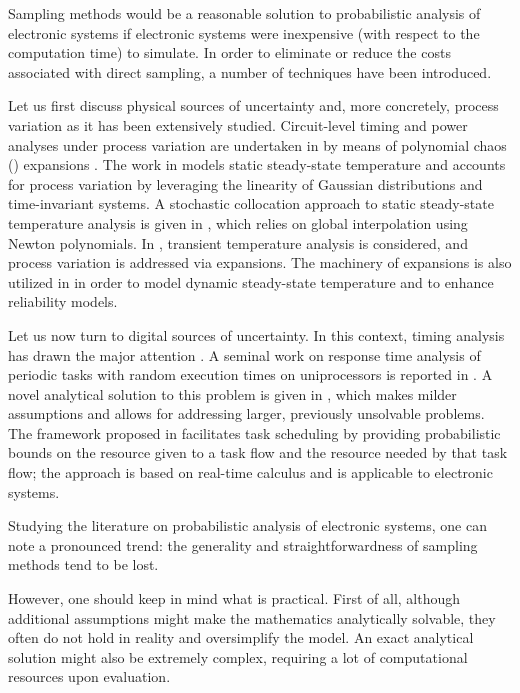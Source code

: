 Sampling methods would be a reasonable solution to probabilistic analysis of
electronic systems if electronic systems were inexpensive (with respect to the
computation time) to simulate. In order to eliminate or reduce the costs
associated with direct sampling, a number of techniques have been introduced.

Let us first discuss physical sources of uncertainty and, more concretely,
process variation as it has been extensively studied. Circuit-level timing and
power analyses under process variation are undertaken in \cite{bhardwaj2008} by
means of polynomial chaos () expansions \cite{xiu2010}. The work in
\cite{juan2012} models static steady-state temperature and accounts for process
variation by leveraging the linearity of Gaussian distributions and
time-invariant systems. A stochastic collocation \cite{xiu2010} approach to
static steady-state temperature analysis is given in \cite{lee2013}, which
relies on global interpolation using Newton polynomials. In \cite{ukhov2014},
transient temperature analysis is considered, and process variation is addressed
via  expansions. The machinery of  expansions is also utilized in
\cite{ukhov2015} in order to model dynamic steady-state temperature
\cite{ukhov2012} and to enhance reliability models.

Let us now turn to digital sources of uncertainty. In this context, timing
analysis has drawn the major attention \cite{quinton2012}. A seminal work on
response time analysis of periodic tasks with random execution times on
uniprocessors is reported in \cite{diaz2002}. A novel analytical solution to
this problem is given in \cite{tanasa2015}, which makes milder assumptions and
allows for addressing larger, previously unsolvable problems. The framework
proposed in \cite{santinelli2011} facilitates task scheduling by providing
probabilistic bounds on the resource given to a task flow and the resource
needed by that task flow; the approach is based on real-time calculus and is
applicable to electronic systems.

Studying the literature on probabilistic analysis of electronic systems, one can
note a pronounced trend: the generality and straightforwardness of sampling
methods tend to be lost. 

However, one should keep in mind what is practical. First of all, although
additional assumptions might make the mathematics analytically solvable, they
often do not hold in reality and oversimplify the model. An exact analytical
solution might also be extremely complex, requiring a lot of computational
resources upon evaluation. 

